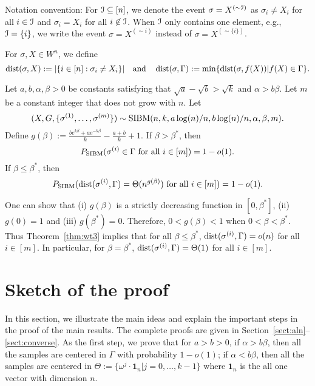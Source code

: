 \documentclass{article}
\begin{document}
Notation convention:
For $\mathcal{I} \subseteq [n]$, we denote the event $\sigma = X^{(\sim \mathcal{I})}$ as $\sigma_i \neq X_i$ for all $i \in \mathcal{I}$ and $\sigma_i = X_i$ for all $i \not\in \mathcal{I}$.
When $\mathcal{I}$ only contains one element, e.g., $\mathcal{I}=\{i\}$, we write the event $\sigma = X^{(\sim i)}$ instead of $\sigma = X^{(\sim\{i\})}$.

For $\sigma,X\in W^n$, we define
$$
\operatorname{dist}(\sigma, X)
:=|\{i\in[n]:\sigma_i\neq X_i\}| 
\quad \text{and} \quad
\operatorname{dist}(\sigma,\Gamma)
:=\min\{\operatorname{dist}(\sigma, f(X)) | f(X) \in \Gamma\} .
$$
\begin{theorem}  \label{thm:wt3}
Let $a,b,\alpha,\beta> 0$ be constants satisfying that $\sqrt{a}-\sqrt{b} > \sqrt{k}$ and $\alpha>b\beta$. Let $m$ be a constant integer that does not grow with $n$.
Let 
$$
(X,G,\{\sigma^{(1)},\dots,\sigma^{(m)}\}) \sim \operatorname{SIBM}(n,k, a\log(n)/n, b\log(n)/n,\alpha,\beta,m).
$$
Define $g(\beta)  := \frac{b e^{k\beta}+a e^{-k\beta}}{k}-\frac{a+b}{k}+1$.
If $\beta>\beta^\ast$, then
$$
P_{\operatorname{SIBM}}(\sigma^{(i)} \in \Gamma \text{~for all~} i\in[m]) = 1-o(1).
$$
If $\beta\le \beta^\ast$, then
$$
P_{\operatorname{SIBM}}(\operatorname{dist}(\sigma^{(i)}, \Gamma)= \Theta(n^{g(\beta)}) \text{~for all~} i\in[m]) = 1-o(1) .
$$
\end{theorem}
One can show that (i) $g(\beta)$ is a strictly decreasing function in $[0,\beta^\ast]$, (ii) $g(0)=1$ and (iii) $g(\beta^\ast)=0$. Therefore, $0<g(\beta)<1$ when $0<\beta<\beta^\ast$. Thus Theorem~\ref{thm:wt3} implies that for all $\beta\le \beta^\ast$, $\operatorname{dist}(\sigma^{(i)},\Gamma)=o(n)$ for all $i\in[m]$. In particular, for $\beta = \beta^\ast$, $\operatorname{dist}(\sigma^{(i)},\Gamma)=\Theta(1)$ for all $i\in[m]$.
\section{Sketch of the proof}
\label{sect:sketch}

In this section, we illustrate the main ideas and explain the important steps in the proof of the main results. The complete proofs are given in Section~\ref{sect:aln}--\ref{sect:converse}.
As the first step, we prove that for $a>b>0$, if $\alpha>b\beta$, then all the samples are centered in $\Gamma$ with probability $1-o(1)$; if $\alpha<b\beta$, then all the samples are centered in $\Theta := \{ \omega^j  \cdot \mathbf{1}_n | j=0, \dots,k-1\}$ where $\mathbf{1}_n$ is the all one vector with dimension $n$.
\end{document}
